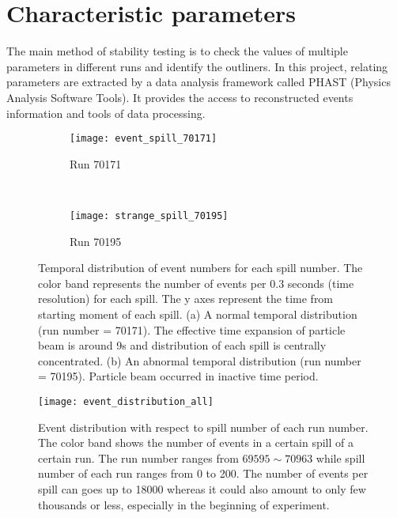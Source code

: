 \section{Characteristic parameters}
The main method of stability testing is to check the values of multiple parameters in different runs and identify the outliners. In this project, relating parameters are extracted by a data analysis framework called PHAST (Physics Analysis Software Tools). It provides the access to reconstructed events information and tools of data processing.

\begin{figure*}[!ht]
	\centering
	\begin{subfigure}[b]{0.49\textwidth}
		\texttt{[image: event\_spill\_70171]}
		\caption{Run 70171}
		\label{fig:EveN_spill_normal}
	\end{subfigure}
	~ %
	\begin{subfigure}[b]{0.49\textwidth}
		\texttt{[image: strange\_spill\_70195]}
		\caption{Run 70195}
		\label{fig:EveN_spill_abnormal}
	\end{subfigure}
	\caption{Temporal distribution of event numbers for each spill number. The color band represents the number of events per 0.3 seconds (time resolution) for each spill. The y axes represent the time from starting moment of each spill. (a) A normal temporal distribution (run number = 70171). The effective time expansion of particle beam is around 9s and distribution of each spill is centrally concentrated. (b) An abnormal temporal distribution (run number = 70195). Particle beam occurred in inactive time period.}
	\label{fig:animals}
\end{figure*}

\begin{figure*}[!h]
	\centering
	\texttt{[image: event\_distribution\_all]}
	\caption{Event distribution with respect to spill number of each run number. The color band shows the number of events in a certain spill of a certain run. The run number ranges from $69595 \sim 70963$ while spill number of each run ranges from 0 to 200. The number of events per spill can goes up to 18000 whereas it could also amount to only few thousands or less, especially in the beginning of experiment. }
	\label{fig:event_distribution_all}
\end{figure*}

